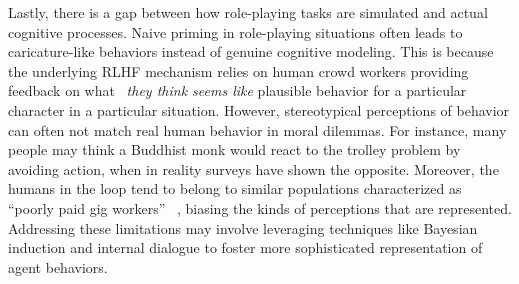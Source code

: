 
Lastly, there is a gap between how role-playing tasks are simulated and actual cognitive processes. Naive priming in role-playing situations often leads to caricature-like behaviors instead of genuine cognitive modeling. This is because the underlying RLHF mechanism relies on human crowd workers providing feedback on what ~\emph{they think seems like} plausible behavior for a particular character in a particular situation. However, stereotypical perceptions of behavior can often not match real human behavior in moral dilemmas. For instance, many people may think a Buddhist monk would react to the trolley problem by avoiding action, when in reality surveys have shown the opposite. Moreover, the humans in the loop tend to belong to similar populations characterized as “poorly paid gig workers” ~\cite{casper2023open}, biasing the kinds of perceptions that are represented. Addressing these limitations may involve leveraging techniques like Bayesian induction and internal dialogue to foster more sophisticated representation of agent behaviors.


% 



